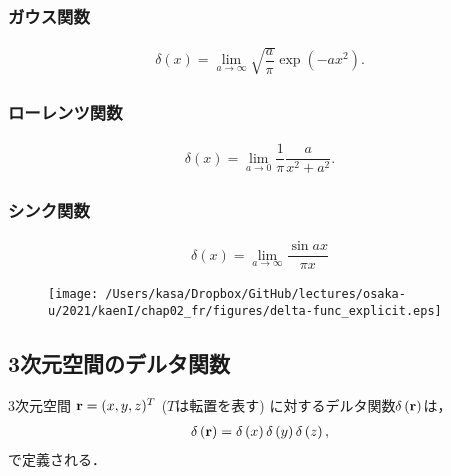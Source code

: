 \subsubsection{ガウス関数}
%
\begin{align}
 \delta \left(x\right) = \lim_{a \to \infty} \sqrt{\dfrac{a}{\pi}}\exp\left(-ax^2\right).
\end{align}
%
\subsubsection{ローレンツ関数}
%
\begin{align}
 \delta \left(x\right) = \lim_{a\to 0} \dfrac{1}{\pi}\dfrac{a}{x^{2}+a^{2}}.
\end{align}
%
\subsubsection{シンク関数}
%
\begin{align}
 \delta\left(x\right) = \lim_{a\to \infty} \dfrac{\sin ax}{\pi x}
\end{align}
%
\begin{figure}[htbp]
 \centering
 \texttt{[image: /Users/kasa/Dropbox/GitHub/lectures/osaka-u/2021/kaenI/chap02\_fr/figures/delta-func\_explicit.eps]} 
\end{figure}
%
\subsection{3次元空間のデルタ関数}
%
3次元空間
${\bf r} = (x,y,z)^{T}$ ($T$は転置を表す)
に対するデルタ関数$\delta\left({\bf r}\right)$は，
\begin{align}
 \delta\left({\bf r}\right) = \delta\left(x\right) \delta\left(y\right) \delta\left(z\right), 
\end{align}
で定義される．
%
%
